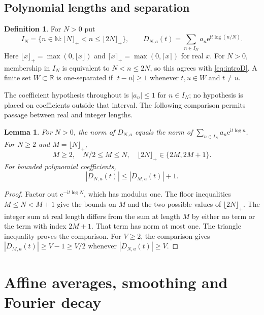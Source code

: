 \documentclass[11pt,a4paper,oneside]{article}
\newtheorem{lemma}[theorem]{Lemma}
\theoremstyle{definition}
\newtheorem{definition}[theorem]{Definition}
\newcommand{\R}{\mathbb R}
\newcommand{\N}{\mathbb N}
\newcommand{\ii}{\mathrm i}
\newcommand{\e}{\mathrm e}
\numberwithin{equation}{section}
\begin{document}
\subsection{Polynomial lengths and separation}
\begin{definition}
For $N>0$ put
\[
 I_N=\{n\in\N:\lfloor N\rfloor_+<n\le\lfloor2N\rfloor_+\},\qquad
 D_{N,a}(t)=\sum_{n\in I_N}a_n\e^{\ii t\log(n/N)}.
\]
Here $\lfloor x\rfloor_+=\max(0,\lfloor x\rfloor)$ and $\lceil x\rceil_+=\max(0,\lceil x\rceil)$ for real $x$. For $N>0$, membership in $I_N$ is equivalent to $N<n\le2N$, so this agrees with \eqref{eq:introD}.
A finite set $W\subset\R$ is one-separated if
$|t-u|\ge1$ whenever $t,u\in W$ and $t\ne u$.
\end{definition}
The coefficient hypothesis throughout is $|a_n|\le1$ for $n\in I_N$;
no hypothesis is placed on coefficients outside that interval.
The following comparison permits passage between real and integer lengths.
\begin{lemma}
For $N>0$, the norm of $D_{N,a}$ equals the norm of
$\sum_{n\in I_N}a_n\e^{\ii t\log n}$. For $N\ge2$ and $M=\lfloor N\rfloor_+$,
\[
 M\ge2,\quad N/2\le M\le N,\quad
 \lfloor2N\rfloor_+\in\{2M,2M+1\}.
\]
For bounded polynomial coefficients,
\[
 |D_{N,a}(t)|\le |D_{M,a}(t)|+1.
\]

\end{lemma}
\begin{proof}
Factor out $\e^{-\ii t\log N}$, which has modulus one. The floor inequalities
$M\le N<M+1$ give the bounds on $M$ and the two possible values of
$\lfloor2N\rfloor_+$. The integer sum at real length differs from the sum at
length $M$ by either no term or the term with index $2M+1$. That term has norm
at most one. The triangle inequality proves the comparison. For $V\ge2$, the comparison gives $|D_{M,a}(t)|\ge V-1\ge V/2$ whenever $|D_{N,a}(t)|\ge V$.
\end{proof}
\section{Affine averages, smoothing and Fourier decay}\label{ch:affine}
\end{document}
